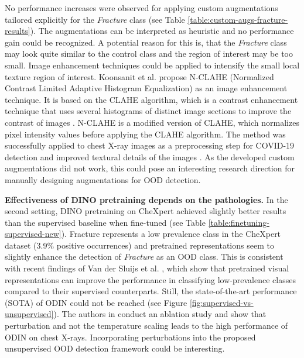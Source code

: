 No performance increases were observed for applying custom augmentations tailored explicitly for the \textit{Fracture} class (see Table \ref{table:custom-augs-fracture-results}).
The augmentations can be interpreted as heuristic and no performance gain could be recognized.
A potential reason for this is, that the \textit{Fracture} class may look quite similar to the control class and the region of interest may be too small. 
Image enhancement techniques could be applied to intensify the small local texture region of interest.
Koonsanit et al. \citep{Koonsanit2017} propose N-CLAHE (Normalized Contrast Limited Adaptive Histogram Equalization) as an image enhancement technique.
It is based on the CLAHE algorithm, which is a contrast enhancement technique that uses several histograms of distinct image sections to improve the contrast of images \citep{Zuiderveld1994}.
N-CLAHE is a modified version of CLAHE, which normalizes pixel intensity values before applying the CLAHE algorithm.
The method was successfully applied to chest X-ray images as a preprocessing step for COVID-19 detection and improved textural details of the images \citep{Horry2020}.
As the developed custom augmentations did not work, this could pose an interesting research direction for manually designing augmentations for OOD detection.
\par
\textbf{Effectiveness of DINO pretraining depends on the pathologies.} 
In the second setting, DINO pretraining on CheXpert achieved slightly better results than the supervised baseline when fine-tuned (see Table \ref{table:finetuning-supervised-new}).
Fracture represents a low prevalence class in the CheXpert dataset (3.9\% positive occurrences) and pretrained representations seem to slightly enhance the detection of \textit{Fracture} as an OOD class.
This is consistent with recent findings of Van der Sluijs et al. \citep{Vandersluijs2023}, which show that pretrained visual representations can improve the performance in classifying low-prevalence classes compared to their supervised counterparts.
Still, the state-of-the-art performance (SOTA) of ODIN could not be reached (see Figure \ref{fig:supervised-vs-unsupervised}).
The authors in \citep{Berger2021} conduct an ablation study and show that perturbation and not the temperature scaling leads to the high performance of ODIN on chest X-rays.
Incorporating perturbations into the proposed unsupervised OOD detection framework could be interesting.
